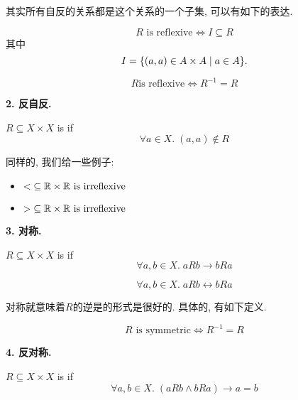 其实所有自反的关系都是这个关系的一个子集, 可以有如下的表达. 

\begin{theorem}
  \[
    R \text{ is reflexive} \iff I \subseteq R
  \]
  其中
  $$I = \{(a, a) \in A \times A \mid a \in A\}.$$
\end{theorem}

\begin{theorem}
  \[R \text{is reflexive} \iff R^{-1}=R\]
\end{theorem}


\textbf{2. 反自反. }

\begin{definition}
  $R \subseteq X \times X$ is  if
  \[
    \forall a \in X.\; (a, a) \notin R
  \]
\end{definition}

同样的, 我们给一些例子: 
\begin{itemize}
  \item $< \;\subseteq \mathbb{R} \times \mathbb{R} \text{ is irreflexive}$
  \item $> \;\subseteq \mathbb{R} \times \mathbb{R} \text{ is irreflexive}$
\end{itemize}

\textbf{3. 对称. }

\begin{definition}[对称 (Symmetric)]
  $R \subseteq X \times X$ is  if
  \[
    \forall a, b \in X.\; a R b \to b R a
  \]

  \begin{center}
\end{center}

  \[
    \forall a, b \in X.\; a R b \leftrightarrow b R a
  \]
\end{definition}

对称就意味着$R$的逆是的形式是很好的. 具体的, 有如下定义. 
\begin{theorem}
  $$R \text{ is symmetric} \iff R^{-1} = R$$
\end{theorem}

\textbf{4. 反对称. }

\begin{definition}
  $R \subseteq X \times X$ is  if
  \[
    \forall a, b \in X.\; (a R b \land b R a) \to a = b
  \]
\end{definition}

